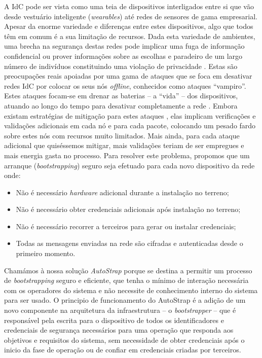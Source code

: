 \documentclass{llncs}
\begin{document}
A \ac{IdC} pode ser vista como uma teia de dispositivos interligados entre si que vão desde vestuário inteligente (\textit{wearables}) até redes de sensores de gama empresarial. 
Apesar da enorme variedade e diferenças entre estes dispositivos, algo que todos têm em comum é a sua limitação de recursos. 
Dada esta variedade de ambientes, uma brecha na segurança destas redes pode implicar uma fuga de informação confidencial ou prover informações sobre as escolhas e paradeiro de um largo número de indivíduos constituindo uma violação de privacidade \cite{Ukil2015}. 
Estas são preocupações reais apoiadas por uma gama de ataques que se foca em desativar redes \ac{IdC} por colocar os seus nós \textit{offline}, conhecidos como  ataques ``vampiro''. 
Estes ataques focam-se em drenar as baterias -- a ``vida'' -- dos dispositivos, atuando ao longo do tempo para desativar completamente a rede \cite{Vasserman2013}\cite{Pongle2015}. 
Embora existam estratégias de mitigação para estes ataques \cite{Vasserman2013}, elas implicam verificações e validações adicionais em cada nó e para cada pacote, colocando um pesado fardo sobre estes nós com recursos muito limitados. 
Mais ainda, para cada ataque adicional que quiséssemos mitigar, mais validações teriam de ser empregues e mais energia gasta no processo.
Para resolver este problema, propomos que um arranque (\textit{bootstrapping}) seguro seja efetuado para cada novo dispositivo da rede onde:
\begin{itemize}
	\item{Não é necessário \textit{hardware} adicional durante a instalação no terreno};
	\item{Não é necessário obter credenciais adicionais após instalação no terreno};
	\item{Não é necessário recorrer a terceiros para gerar ou instalar credenciais};
	\item{Todas as mensagens enviadas na rede são cifradas e autenticadas desde o primeiro momento}.
\end{itemize}
Chamámos à nossa solução \emph{AutoStrap} porque se destina a permitir um processo de \textit{bootstrapping} seguro e eficiente, que tenha o mínimo de interação necessária com os operadores do sistema e não necessite de conhecimento interno do sistema para ser usado. 
O principio de funcionamento do AutoStrap é a adição de um novo componente na arquitetura da infraestrutura -- o \textit{bootstrapper} -- que é responsável pela escrita para o dispositivo de todos os identificadores e credenciais de segurança necessários para uma operação que responda aos objetivos e requisitos do sistema, sem necessidade de obter credenciais após o inicio da fase de operação ou de confiar em credenciais criadas por terceiros. 
\end{document}
